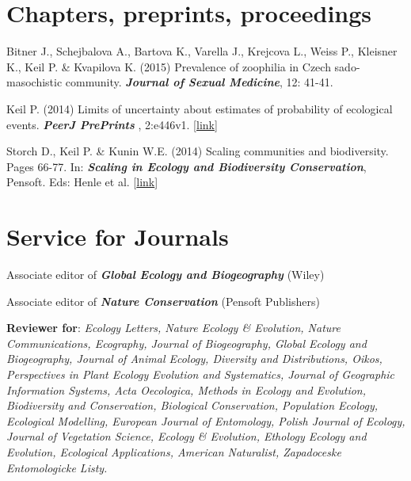 \HRule

\section{Chapters, preprints, proceedings}
\begin{etaremune} 

\item Bitner J., Schejbalova A., Bartova K., Varella J., Krejcova L., Weiss P., Kleisner K., Keil P. \& Kvapilova K. (2015) Prevalence of zoophilia in Czech sado-masochistic community. \textit{\textbf{Journal of Sexual Medicine}}, 12: 41-41.

\item Keil P. (2014) Limits of uncertainty about estimates of probability of ecological events. \textit{\textbf{PeerJ PrePrints }}, 2:e446v1. [\href{https://peerj.com/preprints/446/}{link}]

\item Storch D., Keil P. \& Kunin W.E. (2014) Scaling communities and biodiversity. Pages 66-77. In: \textit{\textbf{Scaling in Ecology and Biodiversity Conservation}}, Pensoft. Eds: Henle et al. [\href{http://ab.pensoft.net/articles.php?id=1169}{link}]
 
\end{etaremune}

\HRule

\section{Service for Journals}

Associate editor of \textit{\textbf{Global Ecology and Biogeography}} (Wiley)

\medskip

Associate editor of \textit{\textbf{Nature Conservation}} (Pensoft Publishers) \\
\medskip

{\bf Reviewer for}: \textit{Ecology Letters, Nature Ecology \& Evolution, Nature Communications, Ecography, Journal of Biogeography, Global Ecology and Biogeography, Journal of Animal Ecology, Diversity and Distributions, Oikos, Perspectives in Plant Ecology Evolution and Systematics, Journal of Geographic Information Systems, Acta Oecologica, Methods in Ecology and Evolution, Biodiversity and Conservation, Biological Conservation, Population Ecology, Ecological Modelling, European Journal of Entomology, Polish Journal of Ecology, Journal of Vegetation Science, Ecology \& Evolution, Ethology Ecology and Evolution, Ecological Applications, American Naturalist, Zapadoceske Entomologicke Listy.}


